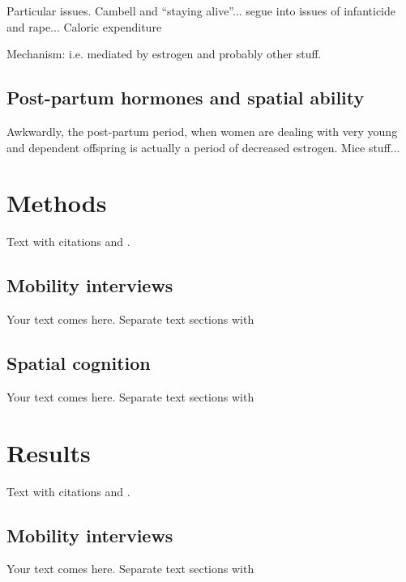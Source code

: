 Particular issues.  Cambell and ``staying alive''... segue into issues of infanticide and rape...  Caloric expenditure

Mechanism: i.e. mediated by estrogen and probably other stuff.

	\subsection{Post-partum hormones and spatial ability}
	\label{sec:1.2}
Awkwardly, the post-partum period, when women are dealing with very young and dependent offspring is actually a period of decreased estrogen.  Mice stuff...

\section{Methods}
\label{sec:2}
Text with citations \cite{RefB} and \cite{RefJ}.
	\subsection{Mobility interviews}
	\label{sec:2.1}
Your text comes here. Separate text sections with	
	\subsection{Spatial cognition}
	\label{sec:2.2}
Your text comes here. Separate text sections with

\section{Results}
\label{sec:3}
Text with citations \cite{RefB} and \cite{RefJ}.
	\subsection{Mobility interviews}
	\label{sec:3.1}
Your text comes here. Separate text sections with	

